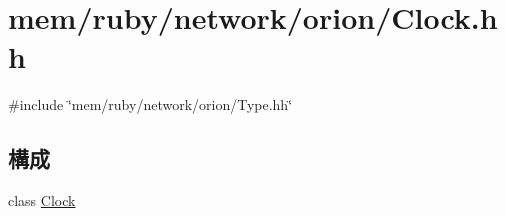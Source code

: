 \hypertarget{Clock_8hh}{
\section{mem/ruby/network/orion/Clock.hh}
\label{Clock_8hh}
}
{\ttfamily \#include \char`\"{}mem/ruby/network/orion/Type.hh\char`\"{}}\par
\subsection*{構成}
\begin{DoxyCompactItemize}
\item 
class \hyperlink{classClock}{Clock}
\end{DoxyCompactItemize}
